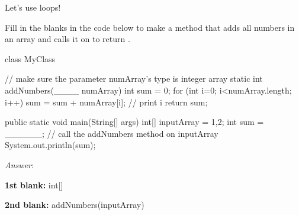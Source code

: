 Let's use loops!

\begin{example}
Fill in the blanks in the code below to make a method that adds all numbers in an array and calls it on  to return . 

\begin{code}
class MyClass {
  // make sure the parameter numArray's type is integer array
  static int addNumbers(____ numArray) {
    int sum = 0;
    for (int i=0; i<numArray.length; i++) {
      sum = sum + numArray[i]; // print i
    }
    return sum; 
  }

  public static void main(String[] args) {
    int[] inputArray = {1,2};
    int sum = ______; // call the addNumbers method on inputArray
    System.out.println(sum);
  }
}
\end{code}

\noindent \emph{Answer}:

\textbf{1st blank:} int[] 

\textbf{2nd blank:} addNumbers(inputArray)
\end{example}





